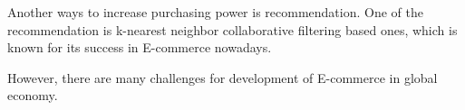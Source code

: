 \documentclass[conference]{IEEEtran}
\begin{document}



 

 Another ways to increase purchasing power is recommendation. One of the recommendation is k-nearest neighbor
 collaborative filtering based ones, which is known for its 
 success in E-commerce nowadays. \cite{sarwar2002recommender} 

However, there are many challenges for development of E-commerce in global economy.\cite{ecimpactspolicy}



\end{document}
